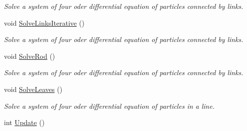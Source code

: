 \begin{DoxyCompactItemize}
\begin{DoxyCompactList}\small\item\em Solve a system of four oder differential equation of particles connected by links. \end{DoxyCompactList}\item 
void \hyperlink{classForces_abcac13d7754b73f6f22b2900a0d46d7d}{Solve\+Links\+Iterative} ()
\begin{DoxyCompactList}\small\item\em Solve a system of four oder differential equation of particles connected by links. \end{DoxyCompactList}\item 
void \hyperlink{classForces_a3953ee74479102530a979e3cd447d174}{Solve\+Rod} ()
\begin{DoxyCompactList}\small\item\em Solve a system of four oder differential equation of particles connected by links. \end{DoxyCompactList}\item 
void \hyperlink{classForces_a7a03a3d52f5a114cbbc22e60af60c049}{Solve\+Leaves} ()
\begin{DoxyCompactList}\small\item\em Solve a system of four oder differential equation of particles in a line. \end{DoxyCompactList}\item 
int \hyperlink{classForces_a02e68a26ce7e19af9d0b729af61e72d3}{Update} ()\hypertarget{classForces_a02e68a26ce7e19af9d0b729af61e72d3}{}\label{classForces_a02e68a26ce7e19af9d0b729af61e72d3}


\end{DoxyCompactItemize}
